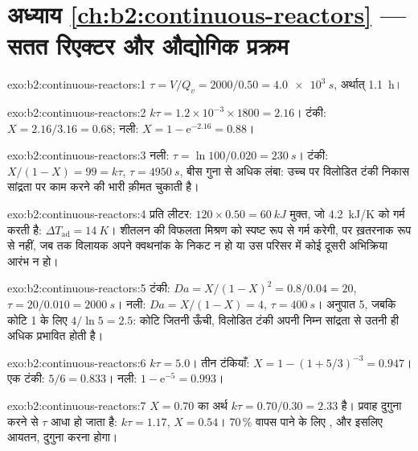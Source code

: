 \section*{अध्याय \ref{ch:b2:continuous-reactors} --- सतत रिएक्टर और औद्योगिक प्रक्रम}

\begin{solution}{exo:b2:continuous-reactors:1}
$\tau = V/Q_v = 2000/0.50 = \qty{4.0e3}{s}$, अर्थात् \qty{1.1}{h}।
\end{solution}

\begin{solution}{exo:b2:continuous-reactors:2}
$k\tau = 1.2 \times 10^{-3} \times 1800 = 2.16$। टंकी: $X = 2.16/3.16 = 0.68$;
नली: $X = 1 - \mathrm e^{-2.16} = 0.88$।
\end{solution}

\begin{solution}{exo:b2:continuous-reactors:3}
नली: $\tau = \ln 100/0.020 = \qty{230}{s}$। टंकी: $X/(1 - X) = 99 = k\tau$,
$\tau = \qty{4950}{s}$, बीस गुना से अधिक लंबा: उच्च  पर
विलोडित टंकी निकास सांद्रता पर काम करने की भारी क़ीमत चुकाती है।
\end{solution}

\begin{solution}{exo:b2:continuous-reactors:4}
प्रति लीटर: $120 \times 0.50 = \qty{60}{kJ}$ मुक्त, जो
\qty{4.2}{kJ/K} को गर्म करती है: $\Delta T_{\text{ad}} = \qty{14}{K}$। शीतलन की विफलता
मिश्रण को स्पष्ट रूप से गर्म करेगी, पर ख़तरनाक रूप से नहीं, जब तक विलायक
अपने क्वथनांक के निकट न हो या उस परिसर में कोई दूसरी अभिक्रिया आरंभ न हो।
\end{solution}

\begin{solution}{exo:b2:continuous-reactors:5}
टंकी: $Da = X/(1 - X)^2 = 0.8/0.04 = 20$, $\tau = 20/0.010 = \qty{2000}{s}$।
नली: $Da = X/(1 - X) = 4$, $\tau = \qty{400}{s}$। अनुपात 5, जबकि कोटि 1 के लिए $4/\ln 5 =
2.5$: कोटि जितनी ऊँची, विलोडित टंकी अपनी निम्न सांद्रता से उतनी ही
अधिक प्रभावित होती है।
\end{solution}

\begin{solution}{exo:b2:continuous-reactors:6}
$k\tau = 5.0$। तीन टंकियाँ: $X = 1 - (1 + 5/3)^{-3} = 0.947$। एक टंकी: $5/6 =
0.833$। नली: $1 - \mathrm e^{-5} = 0.993$।
\end{solution}

\begin{solution}{exo:b2:continuous-reactors:7}
$X = 0.70$ का अर्थ $k\tau = 0.70/0.30 = 2.33$ है। प्रवाह दुगुना करने से $\tau$ आधा हो जाता है:
$k\tau = 1.17$, $X = 0.54$। 70\,\% वापस पाने के लिए , और इसलिए
आयतन, दुगुना करना होगा।
\end{solution}

